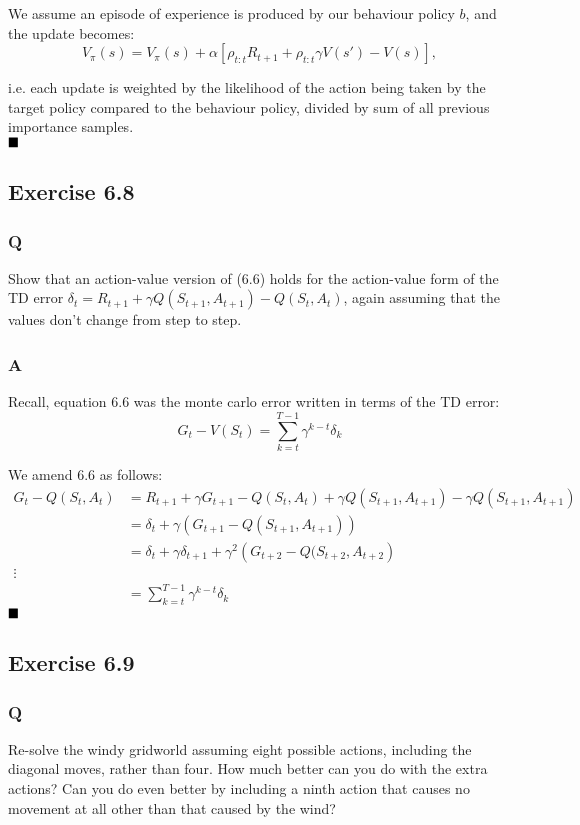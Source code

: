 We assume an episode of experience is produced by our behaviour policy $b$, and the update becomes:
\begin{equation}
V_\pi(s) = V_\pi(s) + \alpha \left[\rho_{t:t} R_{t+1} + \rho_{t:t} \gamma V(s') - V(s)\right], 
\end{equation}

i.e. each update is weighted by the likelihood of the action being taken by the target policy compared to the behaviour policy, divided by sum of all previous importance samples.\\
$
\hfill \blacksquare
$
\subsection{Exercise 6.8}
\subsubsection{Q}
Show that an action-value version of (6.6) holds for the action-value form of the TD error $\delta_t = R_{t+1} + \gamma Q(S_{t+1}, A_{t+1}) - Q(S_t, A_t)$, again assuming that the values don’t change from step to step.
\subsubsection{A}
Recall, equation 6.6 was the monte carlo error written in terms of the TD error:
\begin{equation}
G_t - V(S_t) = \sum_{k=t}^{T-1} \gamma^{k-t} \delta_k
\end{equation}

We amend 6.6 as follows:
\begin{align}
G_t - Q(S_t, A_t) &= R_{t+1} + \gamma G_{t+1} - Q(S_t, A_t) + \gamma Q(S_{t+1}, A_{t+1}) - \gamma Q(S_{t+1}, A_{t+1}) \\
&= \delta_t + \gamma \left(G_{t+1} - Q(S_{t+1}, A_{t+1}) \right) \\
&= \delta_t + \gamma \delta_{t+1} + \gamma^2\left(G_{t+2} - Q(S_{t+2}, A_{t+2}\right) \\
\vdots \\
&= \sum_{k=t}^{T-1} \gamma^{k-t} \delta_k
\end{align}
$
\hfill \blacksquare
$

\subsection{Exercise 6.9}
\subsubsection{Q}
Re-solve the windy gridworld assuming eight possible actions, including the diagonal moves, rather than four. How much better can you do with the extra actions? Can you do even better by including a ninth action that causes no movement at all other than that caused by the wind?

